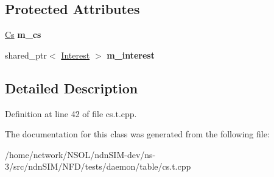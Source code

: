 \subsection*{Protected Attributes}
\begin{DoxyCompactItemize}
\item 
\hyperlink{classnfd_1_1cs_1_1Cs}{Cs} {\bfseries m\+\_\+cs}\hypertarget{classnfd_1_1cs_1_1tests_1_1FindFixture_a0464f7bf0a1299b079def9906ac6a1d1}{}\label{classnfd_1_1cs_1_1tests_1_1FindFixture_a0464f7bf0a1299b079def9906ac6a1d1}

\item 
shared\+\_\+ptr$<$ \hyperlink{classndn_1_1Interest}{Interest} $>$ {\bfseries m\+\_\+interest}\hypertarget{classnfd_1_1cs_1_1tests_1_1FindFixture_add640a3357cbd3dd191d42bf55c0db71}{}\label{classnfd_1_1cs_1_1tests_1_1FindFixture_add640a3357cbd3dd191d42bf55c0db71}

\end{DoxyCompactItemize}


\subsection{Detailed Description}


Definition at line 42 of file cs.\+t.\+cpp.



The documentation for this class was generated from the following file\+:\begin{DoxyCompactItemize}
\item 
/home/network/\+N\+S\+O\+L/ndn\+S\+I\+M-\/dev/ns-\/3/src/ndn\+S\+I\+M/\+N\+F\+D/tests/daemon/table/cs.\+t.\+cpp\end{DoxyCompactItemize}
